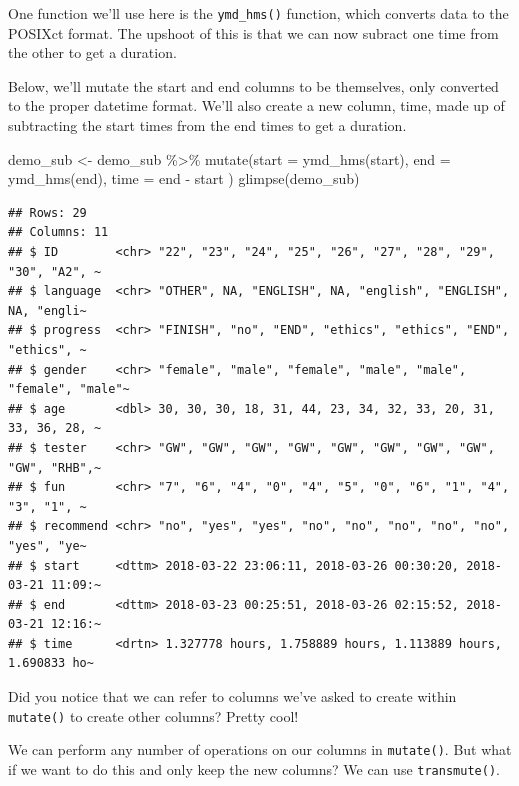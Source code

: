 \documentclass[
]{book}
\newenvironment{Shaded}{\begin{snugshade}}{\end{snugshade}}
\newcommand{\AttributeTok}[1]{\textcolor[rgb]{0.77,0.63,0.00}{#1}}
\newcommand{\FunctionTok}[1]{\textcolor[rgb]{0.00,0.00,0.00}{#1}}
\newcommand{\NormalTok}[1]{#1}
\newcommand{\OtherTok}[1]{\textcolor[rgb]{0.56,0.35,0.01}{#1}}
\newcommand{\SpecialCharTok}[1]{\textcolor[rgb]{0.00,0.00,0.00}{#1}}
\begin{document}
One function we'll use here is the \texttt{ymd\_hms()} function, which converts data to the POSIXct format. The upshoot of this is that we can now subract one time from the other to get a duration.

Below, we'll mutate the start and end columns to be themselves, only converted to the proper datetime format. We'll also create a new column, time, made up of subtracting the start times from the end times to get a duration.

\begin{Shaded}
\begin{Highlighting}[]
\NormalTok{demo\_sub }\OtherTok{\textless{}{-}}\NormalTok{ demo\_sub }\SpecialCharTok{\%\textgreater{}\%}
  \FunctionTok{mutate}\NormalTok{(}\AttributeTok{start =} \FunctionTok{ymd\_hms}\NormalTok{(start),}
         \AttributeTok{end =} \FunctionTok{ymd\_hms}\NormalTok{(end),}
         \AttributeTok{time =}\NormalTok{ end }\SpecialCharTok{{-}}\NormalTok{ start}
\NormalTok{         )}
\FunctionTok{glimpse}\NormalTok{(demo\_sub)}
\end{Highlighting}
\end{Shaded}

\begin{verbatim}
## Rows: 29
## Columns: 11
## $ ID        <chr> "22", "23", "24", "25", "26", "27", "28", "29", "30", "A2", ~
## $ language  <chr> "OTHER", NA, "ENGLISH", NA, "english", "ENGLISH", NA, "engli~
## $ progress  <chr> "FINISH", "no", "END", "ethics", "ethics", "END", "ethics", ~
## $ gender    <chr> "female", "male", "female", "male", "male", "female", "male"~
## $ age       <dbl> 30, 30, 30, 18, 31, 44, 23, 34, 32, 33, 20, 31, 33, 36, 28, ~
## $ tester    <chr> "GW", "GW", "GW", "GW", "GW", "GW", "GW", "GW", "GW", "RHB",~
## $ fun       <chr> "7", "6", "4", "0", "4", "5", "0", "6", "1", "4", "3", "1", ~
## $ recommend <chr> "no", "yes", "yes", "no", "no", "no", "no", "no", "yes", "ye~
## $ start     <dttm> 2018-03-22 23:06:11, 2018-03-26 00:30:20, 2018-03-21 11:09:~
## $ end       <dttm> 2018-03-23 00:25:51, 2018-03-26 02:15:52, 2018-03-21 12:16:~
## $ time      <drtn> 1.327778 hours, 1.758889 hours, 1.113889 hours, 1.690833 ho~
\end{verbatim}

Did you notice that we can refer to columns we've asked to create within \texttt{mutate()} to create other columns? Pretty cool!

We can perform any number of operations on our columns in \texttt{mutate()}. But what if we want to do this and only keep the new columns? We can use \texttt{transmute()}.
\end{document}
